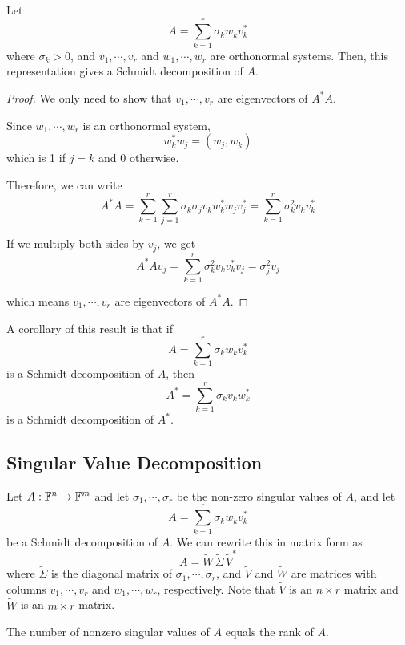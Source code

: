 \begin{theorem}
Let
$$A = \sum_{k=1}^{r} \sigma_{k} w_{k} v_{k}^{*}$$
where $\sigma_{k} > 0$, and $v_{1}, \cdots, v_{r}$ and $w_{1}, \cdots, w_{r}$ are orthonormal systems. Then, this representation gives a Schmidt decomposition of $A$. 
\end{theorem}

\begin{proof}
We only need to show that $v_{1}, \cdots, v_{r}$ are eigenvectors of $A^{*}A$. 

Since $w_{1}, \cdots, w_{r}$ is an orthonormal system, 
$$w_{k}^{*} w_{j} = (w_{j}, w_{k})$$ 
which is 1 if $j = k$ and 0 otherwise. 

Therefore, we can write 
$$A^{*} A = \sum_{k=1}^{r} \sum_{j=1}^{r} \sigma_{k} \sigma_{j}    v_{k} w_{k}^{*} w_{j} v_{j}^{*} = \sum_{k=1}^{r} \sigma_{k}^{2} v_{k} v_{k}^{*}$$

If we multiply both sides by $v_{j}$, we get 
$$A^{*} A v_{j} = \sum_{k=1}^{r} \sigma_{k}^{2} v_{k} v_{k}^{*}v_{j} = \sigma_{j}^{2} v_{j}$$

which means $v_{1}, \cdots, v_{r}$ are eigenvectors of $A^{*} A$. 
\end{proof}

A corollary of this result is that if 
$$A = \sum_{k=1}^{r} \sigma_{k} w_{k} v_{k}^{*}$$
is a Schmidt decomposition of $A$, then 
$$A^{*} = \sum_{k=1}^{r} \sigma_{k} v_{k} w_{k}^{*}$$
is a Schmidt decomposition of $A^{*}$. 

\subsection{Singular Value Decomposition}

Let $A : \mathbb{F}^{n} \rightarrow \mathbb{F}^{m}$ and let $\sigma_{1}, \cdots, \sigma_{r}$ be the non-zero singular values of $A$, and let 
$$A = \sum_{k=1}^{r} \sigma_{k} w_{k} v_{k}^{*}$$ 
be a Schmidt decomposition of $A$. We can rewrite this in matrix form as 
$$A = \widetilde{W} \, \widetilde{\Sigma} \, \widetilde{V}^{*}$$
where $\widetilde{\Sigma}$ is the diagonal matrix of $\sigma_{1}, \cdots, \sigma_{r}$, and $\widetilde{V}$ and $\widetilde{W}$ are matrices with columns $v_{1}, \cdots, v_{r}$ and $w_{1}, \cdots, w_{r}$, respectively. Note that $\widetilde{V}$ is an $n \times r$ matrix and $\widetilde{W}$ is an $m \times r$ matrix. 

\begin{theorem}
The number of nonzero singular values of $A$ equals the rank of $A$.
\end{theorem}

